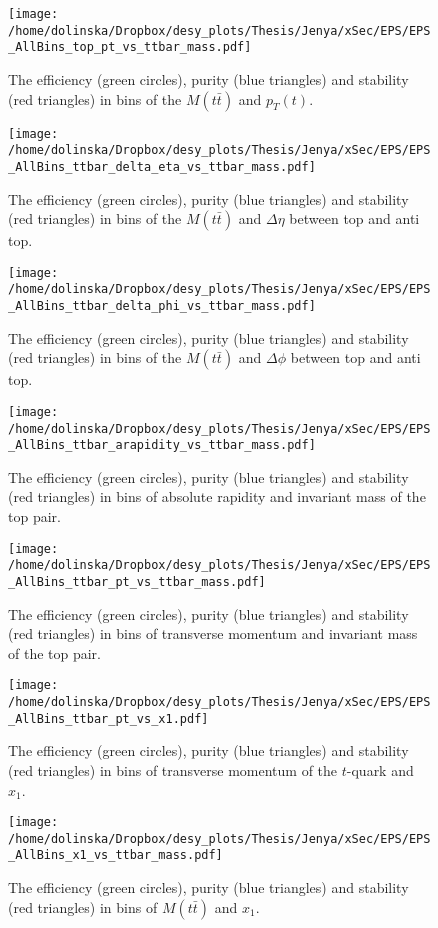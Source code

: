 \begin{figure}[p]
  \centering
  \texttt{[image: /home/dolinska/Dropbox/desy\_plots/Thesis/Jenya/xSec/EPS/EPS\_AllBins\_top\_pt\_vs\_ttbar\_mass.pdf]}
  \caption{The efficiency (green circles), purity (blue triangles) and stability (red triangles) in bins of the $M(t\bar{t})$ and $p_{T}(t)$.}
  \label{fig:EPS_2D_Mtt_pt}
\end{figure}

\begin{figure}[p]
  \centering
  \texttt{[image: /home/dolinska/Dropbox/desy\_plots/Thesis/Jenya/xSec/EPS/EPS\_AllBins\_ttbar\_delta\_eta\_vs\_ttbar\_mass.pdf]}
  \caption{The efficiency (green circles), purity (blue triangles) and stability (red triangles) in bins of the $M(t\bar{t})$ and $\Delta\eta$ between top and anti top.}
  \label{fig:EPS_2D_Mtt_eta}
\end{figure}

\begin{figure}[p]
  \centering
  \texttt{[image: /home/dolinska/Dropbox/desy\_plots/Thesis/Jenya/xSec/EPS/EPS\_AllBins\_ttbar\_delta\_phi\_vs\_ttbar\_mass.pdf]}
  \caption{The efficiency (green circles), purity (blue triangles) and stability (red triangles) in bins of the $M(t\bar{t})$ and $\Delta\phi$ between top and anti top.}
  \label{fig:EPS_2D_Mtt_phi}
\end{figure}

\begin{figure}[p]
  \centering
  \texttt{[image: /home/dolinska/Dropbox/desy\_plots/Thesis/Jenya/xSec/EPS/EPS\_AllBins\_ttbar\_arapidity\_vs\_ttbar\_mass.pdf]}
  \caption{The efficiency (green circles), purity (blue triangles) and stability (red triangles) in bins of absolute rapidity and invariant mass of the top pair.}
  \label{fig:EPS_2D_ytt_Mtt}
\end{figure}

\begin{figure}[p]
  \centering
  \texttt{[image: /home/dolinska/Dropbox/desy\_plots/Thesis/Jenya/xSec/EPS/EPS\_AllBins\_ttbar\_pt\_vs\_ttbar\_mass.pdf]}
  \caption{The efficiency (green circles), purity (blue triangles) and stability (red triangles) in bins of transverse momentum and invariant mass of the top pair.}
  \label{fig:EPS_2D_pttt_Mtt}
\end{figure}

\begin{figure}[p]
  \centering
  \texttt{[image: /home/dolinska/Dropbox/desy\_plots/Thesis/Jenya/xSec/EPS/EPS\_AllBins\_ttbar\_pt\_vs\_x1.pdf]}
  \caption{The efficiency (green circles), purity (blue triangles) and stability (red triangles) in bins of transverse momentum of the $t$-quark and  $x_{1}$.}
  \label{fig:EPS_2D_ptt_x1}
\end{figure}

\begin{figure}[p]
  \centering
  \texttt{[image: /home/dolinska/Dropbox/desy\_plots/Thesis/Jenya/xSec/EPS/EPS\_AllBins\_x1\_vs\_ttbar\_mass.pdf]}
  \caption{The efficiency (green circles), purity (blue triangles) and stability (red triangles) in bins of $M(t\bar{t})$ and  $x_{1}$.}
  \label{fig:EPS_2D_Mtt_x1}
\end{figure}